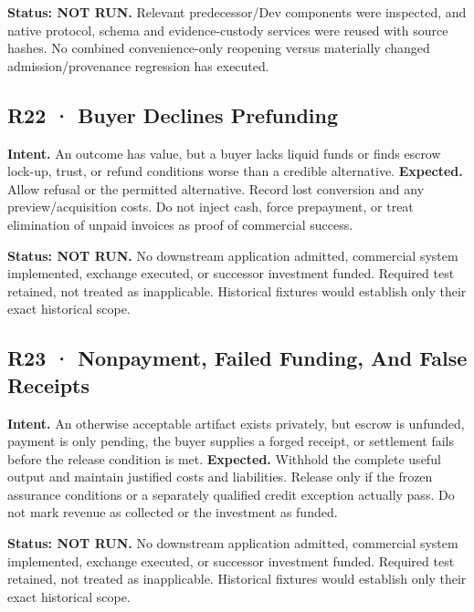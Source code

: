 \documentclass[10pt,letterpaper]{article}
\begin{document}
\textbf{Status: NOT RUN.} Relevant predecessor/Dev components were
inspected, and native protocol, schema and evidence-custody services
were reused with source hashes. No combined convenience-only reopening
versus materially changed admission/provenance regression has executed.

\hypertarget{r22-buyer-declines-prefunding}{%
\subsection{R22 · Buyer Declines
Prefunding}\label{r22-buyer-declines-prefunding}}

\textbf{Intent.} An outcome has value, but a buyer lacks liquid funds or
finds escrow lock-up, trust, or refund conditions worse than a credible
alternative. \textbf{Expected.} Allow refusal or the permitted
alternative. Record lost conversion and any preview/acquisition costs.
Do not inject cash, force prepayment, or treat elimination of unpaid
invoices as proof of commercial success.

\textbf{Status: NOT RUN.} No downstream application admitted, commercial
system implemented, exchange executed, or successor investment funded.
Required test retained, not treated as inapplicable. Historical fixtures
would establish only their exact historical scope.

\hypertarget{r23-nonpayment-failed-funding-and-false-receipts}{%
\subsection{R23 · Nonpayment, Failed Funding, And False
Receipts}\label{r23-nonpayment-failed-funding-and-false-receipts}}

\textbf{Intent.} An otherwise acceptable artifact exists privately, but
escrow is unfunded, payment is only pending, the buyer supplies a forged
receipt, or settlement fails before the release condition is met.
\textbf{Expected.} Withhold the complete useful output and maintain
justified costs and liabilities. Release only if the frozen assurance
conditions or a separately qualified credit exception actually pass. Do
not mark revenue as collected or the investment as funded.

\textbf{Status: NOT RUN.} No downstream application admitted, commercial
system implemented, exchange executed, or successor investment funded.
Required test retained, not treated as inapplicable. Historical fixtures
would establish only their exact historical scope.
\end{document}
